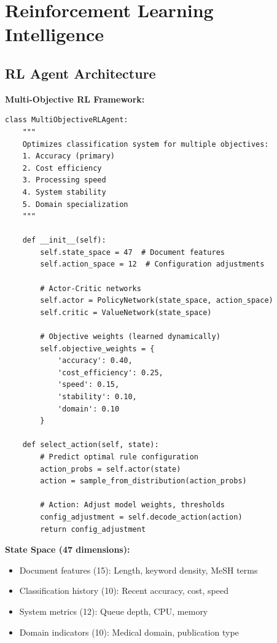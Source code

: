\section{Reinforcement Learning Intelligence}

\subsection{RL Agent Architecture}

\textbf{Multi-Objective RL Framework:}

\begin{lstlisting}[style=pythonstyle]
class MultiObjectiveRLAgent:
    """
    Optimizes classification system for multiple objectives:
    1. Accuracy (primary)
    2. Cost efficiency
    3. Processing speed
    4. System stability
    5. Domain specialization
    """
    
    def __init__(self):
        self.state_space = 47  # Document features
        self.action_space = 12  # Configuration adjustments
        
        # Actor-Critic networks
        self.actor = PolicyNetwork(state_space, action_space)
        self.critic = ValueNetwork(state_space)
        
        # Objective weights (learned dynamically)
        self.objective_weights = {
            'accuracy': 0.40,
            'cost_efficiency': 0.25,
            'speed': 0.15,
            'stability': 0.10,
            'domain': 0.10
        }
    
    def select_action(self, state):
        # Predict optimal rule configuration
        action_probs = self.actor(state)
        action = sample_from_distribution(action_probs)
        
        # Action: Adjust model weights, thresholds
        config_adjustment = self.decode_action(action)
        return config_adjustment
\end{lstlisting}

\textbf{State Space (47 dimensions):}
\begin{itemize}
    \item Document features (15): Length, keyword density, MeSH terms
    \item Classification history (10): Recent accuracy, cost, speed
    \item System metrics (12): Queue depth, CPU, memory
    \item Domain indicators (10): Medical domain, publication type
\end{itemize}

